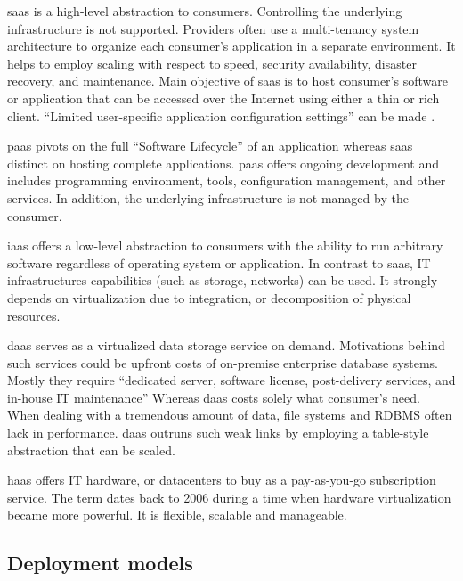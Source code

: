 \ac{saas} is a high-level abstraction to consumers. Controlling the underlying infrastructure is not supported.
Providers often use a multi-tenancy system architecture to organize each consumer's application in a separate environment.
It helps to employ scaling with respect to speed, security availability, disaster recovery, and maintenance.
Main objective of \ac{saas} is to host consumer's software or application that can be accessed over the Internet using either a thin or rich client. \cite{Dillon2010}
\enquote{Limited user-specific application configuration settings} can be made \cite{Mell2011}.

\ac{paas} pivots on the full \enquote{Software Lifecycle} of an application whereas \ac{saas} distinct on hosting complete applications.
\ac{paas} offers ongoing development and includes programming environment, tools, configuration management, and other services.
In addition, the underlying infrastructure is not managed by the consumer. \cite{Mell2011}

\ac{iaas} offers a low-level abstraction to consumers with the ability to run arbitrary software regardless of operating system or application.
In contrast to \ac{saas}, IT infrastructures capabilities (such as storage, networks) can be used.
It strongly depends on virtualization due to integration, or decomposition of physical resources. \cite{Mell2011}

\ac{daas} serves as a virtualized data storage service on demand. Motivations behind such services could be upfront costs of on-premise enterprise database systems. \cite{Dillon2010}
Mostly they require \enquote{dedicated server, software license, post-delivery services, and in-house IT maintenance} \cite{Dillon2010}
Whereas \ac{daas} costs solely what consumer's need.
When dealing with a tremendous amount of data, file systems and RDBMS often lack in performance.
\ac{daas} outruns such weak links by employing a table-style abstraction that can be scaled.\cite{Dillon2010}

\ac{haas} offers IT hardware, or datacenters to buy as a pay-as-you-go subscription service.
The term dates back to 2006 during a time when hardware virtualization became more powerful.
It is flexible, scalable and manageable.\cite{Wang2010}

\subsection{Deployment models}
\label{subsec:cloud-deployment}

